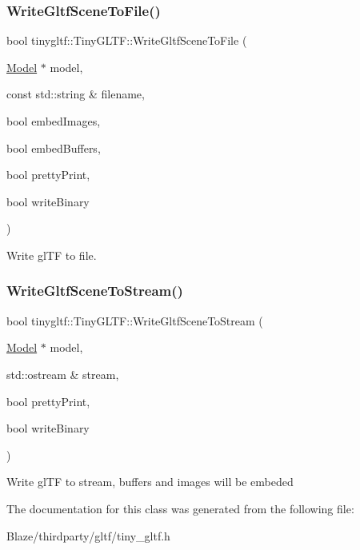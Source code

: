 \subsubsection{\texorpdfstring{Write\+Gltf\+Scene\+To\+File()}{WriteGltfSceneToFile()}}
{\footnotesize\ttfamily bool tinygltf\+::\+Tiny\+G\+L\+T\+F\+::\+Write\+Gltf\+Scene\+To\+File (\begin{DoxyParamCaption}\item[{\hyperlink{classtinygltf_1_1Model}{Model} $\ast$}]{model,  }\item[{const std\+::string \&}]{filename,  }\item[{bool}]{embed\+Images,  }\item[{bool}]{embed\+Buffers,  }\item[{bool}]{pretty\+Print,  }\item[{bool}]{write\+Binary }\end{DoxyParamCaption})}

Write gl\+TF to file. \mbox{\label{classtinygltf_1_1TinyGLTF_aa219527a19b8c2d72821f6a6a91651dc}} 
\subsubsection{\texorpdfstring{Write\+Gltf\+Scene\+To\+Stream()}{WriteGltfSceneToStream()}}
{\footnotesize\ttfamily bool tinygltf\+::\+Tiny\+G\+L\+T\+F\+::\+Write\+Gltf\+Scene\+To\+Stream (\begin{DoxyParamCaption}\item[{\hyperlink{classtinygltf_1_1Model}{Model} $\ast$}]{model,  }\item[{std\+::ostream \&}]{stream,  }\item[{bool}]{pretty\+Print,  }\item[{bool}]{write\+Binary }\end{DoxyParamCaption})}

Write gl\+TF to stream, buffers and images will be embeded 

The documentation for this class was generated from the following file\+:\begin{DoxyCompactItemize}
\item 
Blaze/thirdparty/gltf/tiny\+\_\+gltf.\+h\end{DoxyCompactItemize}
